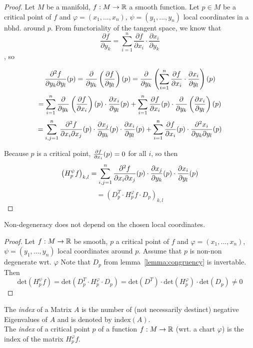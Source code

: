 \documentclass[a4paper,11pt]{article}
\begin{document}
\begin{proof}

   Let $M$ be a manifold, $f: M \rightarrow \R$ a smooth function.
   Let $p \in M$ be a critical point of $f$ and $\varphi = (x_1, ..., x_n)$, $\psi = (y_1, ..., y_n)$
   local coordinates in a nbhd. around $p$.
   From functoriality of the tangent space, we know that 
   \[ \frac{\partial f}{\partial y_k} = \sum_{i=1}^n \frac{\partial f}{\partial x_i} \cdot \frac{\partial x_i}{\partial y_k} \]
   , so 

   \[ \pdderive[f]{y_k}{y_l} (p) 
   = \pderive{y_k} \left( \pderive[f]{y_l} \right) (p) 
   = \pderive{y_k} \left( \sum_{i=1}^n \pderive[f]{x_i} \cdot \pderive[x_i]{y_l} \right) (p) \]
   \[ = \sum_{i=1}^n \pderive{y_k} \left( \pderive[f]{x_i} \right) (p) \cdot \pderive[x_i]{y_l} (p) 
   + \sum_{i=1}^n \pderive[f]{x_i} (p) \cdot \pderive{y_k} \left( \pderive[x_i]{y_l} \right) (p) \]
   \[ = \sum_{i,j = 1}^n \pdderive[f]{x_i}{x_j} (p) \cdot \pderive[x_j]{y_k} (p) \cdot \pderive[x_i]{y_l}(p)
   + \sum_{i=1}^n \pderive[f]{x_i} (p) \cdot \pdderive[x_i]{y_k}{y_l}(p)\]
   
   Because $p$ is a critical point, $\pderive[f]{x_i} (p) = 0$ for all $i$, so then
   \[ \left( H_p^{\psi}f \right)_{k,l} = \sum_{i,j = 1}^n \pdderive[f]{x_i}{x_j} (p) \cdot \pderive[x_j]{y_k}(p) \cdot \pderive[x_i]{y_l} (p) \]
   \[ = \left( D_p^T \cdot H_p^{\varphi}f \cdot D_p \right)_{k,l} \]

\end{proof}

\begin{lemma} 
   \label{lemma:non-degeneracy}
   Non-degeneracy does not depend on the chosen local coordinates.
\end{lemma}

\begin{proof}
   Let $f: M \rightarrow \R$ be smooth, $p$ a critical point of $f$ and $\varphi = (x_1, ..., x_n)$, $\psi = (y_1, ..., y_n)$ 
   local coordinates around $p$. Assume that $p$ is non-non degenerate wrt. $\varphi$ Note that $D_p$ from lemma~\ref{lemma:congruency} is invertable. Then
   \[ \text{det}(H_p^{\psi}f) = \text{det}(D_p^T \cdot H_p^{\varphi} \cdot D_p) = \text{det}(D^T) \cdot \text{det}(H_p^{\varphi}) \cdot \text{det}(D_p) \neq 0 \]
\end{proof}

\begin{definition}[Index]
   \label{def:index}

   The \textit{index} of a Matrix $A$ is the number of (not necessarily destinct) negative Eigenvalues of $A$ and is denoted by
   $\text{index}(A)$. \\ The \textit{index} of a critical point $p$ of a function $f: M \rightarrow \R$ (wrt. a chart $\varphi$)
   is the index of the matrix $H_p^{\varphi}f$.
\end{definition}
\end{document}
